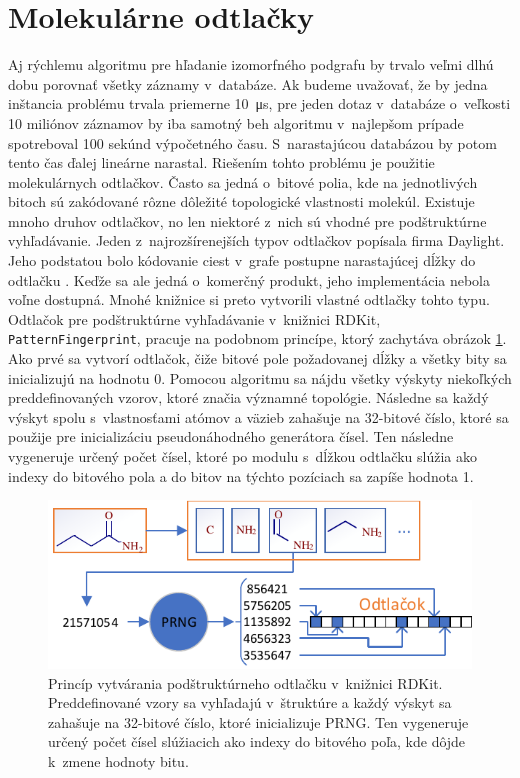 \documentclass[slovak]{ExcelAtFIT} %
\begin{document}
\section{Molekulárne odtlačky}
Aj rýchlemu algoritmu pre hľadanie izomorfného podgrafu by trvalo veľmi dlhú dobu porovnať všetky zá\-zna\-my v~databáze. Ak budeme uvažovať, že by jedna inštancia problému trvala priemerne \SI{10}{\micro\second}, pre jeden dotaz v~databáze o~veľkosti 10 miliónov záznamov by iba samotný beh algoritmu v~najlepšom prípade spotreboval 100 sekúnd výpočetného času. S~narastajúcou databázou by potom tento čas ďalej lineárne narastal. Riešením tohto problému je použitie molekulárnych odtlačkov. Často sa jedná o~bitové polia, kde na jednotlivých bitoch sú zakódované rôzne dôležité topologické vlastnosti molekúl. Existuje mnoho druhov odtlačkov, no len niektoré z~nich sú vhodné pre pod\-štruk\-túrne vyhľadávanie. Jeden z~najrozšírenejších typov odtlačkov popísala firma Daylight. Jeho podstatou bolo kódovanie ciest v~grafe postupne narastajúcej dĺžky do odtlačku \cite{daylight_fp}. Keďže sa ale jedná o~komerčný produkt, jeho implementácia nebola voľne dostupná. Mnohé knižnice si preto vytvorili vlastné odtlačky tohto typu. Odtlačok pre podštruktúrne vyhľadávanie v~knižnici RDKit, \texttt{PatternFingerprint}, pracuje na podobnom prin\-cípe, ktorý zachytáva obrázok \ref{fig:fp}. Ako prvé sa vytvorí odtlačok, čiže bitové pole požadovanej dĺžky a všetky bity sa inicializujú na hodnotu 0. Pomocou algoritmu sa nájdu všetky výskyty niekoľkých preddefinovaných vzorov, ktoré značia významné topológie. Následne sa každý výskyt spolu s~vlastnosťami atómov a väzieb zahašuje na 32-bitové číslo, ktoré sa použije pre inicializáciu pseudonáhodného generátora čísel. Ten následne vygeneruje určený počet čísel, ktoré po modulu s~dĺžkou odtlačku slúžia ako indexy do bitového pola a do bitov na týchto pozíciach sa zapíše hodnota 1.

\begin{figure}[!htb]
	\centering
	\includegraphics[width=1\linewidth]{images/daylight.pdf}
	\caption{Princíp vytvárania podštruktúrneho odtlačku v~knižnici RDKit. Preddefinované vzory sa vyhľadajú v~štruktúre a každý výskyt sa zahašuje na 32-bitové číslo, ktoré inicializuje PRNG. Ten vy\-ge\-ne\-ru\-je určený počet čísel slúžiacich ako indexy do bitového poľa, kde dôjde k~zmene hodnoty bitu.}
	\label{fig:fp}
\end{figure}
\end{document}
